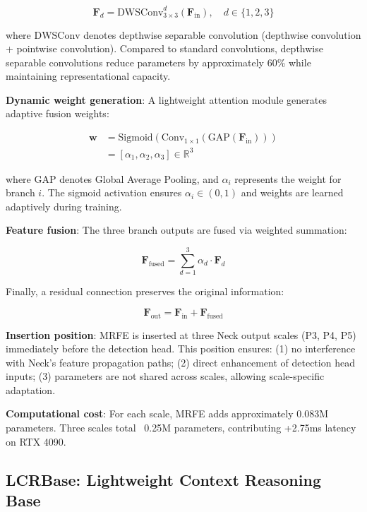 \documentclass[journal]{IEEEtran}
\begin{document}
\begin{equation}
\mathbf{F}_d = \text{DWSConv}_{3\times3}^{d}(\mathbf{F}_{\text{in}}), \quad d \in \{1,2,3\}
\end{equation}

where $\text{DWSConv}$ denotes depthwise separable convolution (depthwise convolution + pointwise convolution). Compared to standard convolutions, depthwise separable convolutions reduce parameters by approximately 60\% while maintaining representational capacity.

\textbf{Dynamic weight generation}: A lightweight attention module generates adaptive fusion weights:

\begin{align}
\mathbf{w} &= \text{Sigmoid}(\text{Conv}_{1\times1}(\text{GAP}(\mathbf{F}_{\text{in}}))) \\
&= [\alpha_1, \alpha_2, \alpha_3] \in \mathbb{R}^{3}
\end{align}

where GAP denotes Global Average Pooling, and $\alpha_i$ represents the weight for branch $i$. The sigmoid activation ensures $\alpha_i \in (0,1)$ and weights are learned adaptively during training.

\textbf{Feature fusion}: The three branch outputs are fused via weighted summation:

\begin{equation}
\mathbf{F}_{\text{fused}} = \sum_{d=1}^{3} \alpha_d \cdot \mathbf{F}_d
\end{equation}

Finally, a residual connection preserves the original information:

\begin{equation}
\mathbf{F}_{\text{out}} = \mathbf{F}_{\text{in}} + \mathbf{F}_{\text{fused}}
\end{equation}

\textbf{Insertion position}: MRFE is inserted at three Neck output scales (P3, P4, P5) immediately before the detection head. This position ensures: (1) no interference with Neck's feature propagation paths; (2) direct enhancement of detection head inputs; (3) parameters are not shared across scales, allowing scale-specific adaptation.

\textbf{Computational cost}: For each scale, MRFE adds approximately 0.083M parameters. Three scales total ~0.25M parameters, contributing +2.75ms latency on RTX 4090.

\subsection{LCRBase: Lightweight Context Reasoning Base}
\end{document}

